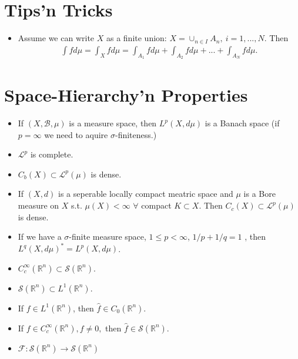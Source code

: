 \section*{Tips'n Tricks}
\begin{itemize}
    \item Assume we can write \(X\) as a finite union: \(X=\cup_{n\in I}A_n, \ i={1,...,N}\). Then
    \begin{align*}
        \int fd\mu = \int_X fd\mu = \int_{A_1}fd\mu + \int_{A_2}fd\mu + ... + \int_{A_N}fd\mu.
    \end{align*}
\end{itemize}
\section*{Space-Hierarchy'n Properties}
\begin{itemize}
    \item If \((X,\mathscr{B},\mu)\) is a measure space, then \(L^p(X,d\mu)\) is a Banach space (if \(p=\infty\) we need to aquire \(\sigma\)-finiteness.)
    \item \(\mathcal{L}^p\) is complete.
    \item \(C_b(X)\subset \mathcal{L}^p(\mu)\) is dense.
    \item If \((X,d)\) is a seperable locally compact meatric space and \(\mu\) is a Bore measure on \(X\) s.t. \(\mu(X)<\infty\) \(\forall \) compact \(K\subset X\). Then \(C_c(X)\subset \mathcal{L}^p(\mu)\) is dense.
    \item If we have a \(\sigma\)-finite measure space, \(1\leq p<\infty\), \(1/p+1/q=1\) , then \(L^q(X,d\mu)^* = L^p(X,d\mu)\).
    \item \(C^{\infty}_{c}(\mathbb{R}^n) \subset \mathcal{S}(\mathbb{R}^n)\).
    \item \(\mathcal{S}(\mathbb{R}^n) \subset L^1(\mathbb{R}^n)\).
    \item If \(f\in L^1(\mathbb{R}^n)\), then \(\hat{f}\in C_0(\mathbb{R}^n)\).
    \item If \(f\in C^{\infty}_{c}(\mathbb{R}^n), f\neq 0, \) then \(\hat{f}\in \mathcal{S}(\mathbb{R}^n)\).
    \item \(\mathcal{F}: \mathcal{S}(\mathbb{R}^n)\rightarrow \mathcal{S}(\mathbb{R}^n)\)
\end{itemize}